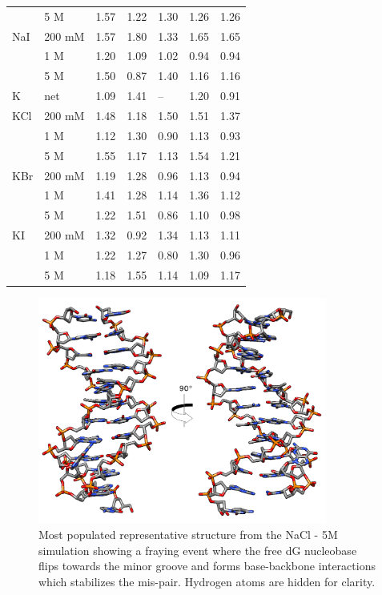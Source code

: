 \documentclass[9pt,lessons]{livecoms}
\begin{document}
\begin{table}[]
\begin{tabular}{lllllll}
         & 5 M              & 1.57    & 1.22    & 1.30    & 1.26    & 1.26    \\
NaI      & 200 mM           & 1.57    & 1.80    & 1.33    & 1.65    & 1.65    \\
         & 1 M              & 1.20    & 1.09    & 1.02    & 0.94    & 0.94    \\
         & 5 M              & 1.50    & 0.87    & 1.40    & 1.16    & 1.16    \\
K        & net              & 1.09    & 1.41    & --      & 1.20    & 0.91    \\
KCl      & 200 mM           & 1.48    & 1.18    & 1.50    & 1.51    & 1.37    \\
         & 1 M              & 1.12    & 1.30    & 0.90    & 1.13    & 0.93    \\
         & 5 M              & 1.55    & 1.17    & 1.13    & 1.54    & 1.21    \\
KBr      & 200 mM           & 1.19    & 1.28    & 0.96    & 1.13    & 0.94    \\
         & 1 M              & 1.41    & 1.28    & 1.14    & 1.36    & 1.12    \\
         & 5 M              & 1.22    & 1.51    & 0.86    & 1.10    & 0.98    \\
KI       & 200 mM           & 1.32    & 0.92    & 1.34    & 1.13    & 1.11    \\
         & 1 M              & 1.22    & 1.27    & 0.80    & 1.30    & 0.96    \\
         & 5 M              & 1.18    & 1.55    & 1.14    & 1.09    & 1.17   
\end{tabular}
\end{table}

\begin{figure}[h]
\centering
\includegraphics[width=95mm]{1us-NaCl_5M-fray-minor-groove}
\caption{Most populated representative structure from the NaCl - 5M simulation showing a fraying event where the free dG nucleobase flips towards the minor groove and forms base-backbone interactions which stabilizes the mis-pair. Hydrogen atoms are hidden for clarity.}
\label{1us-NaCl_5M-fray-minor-groove}
\end{figure}
\end{document}

